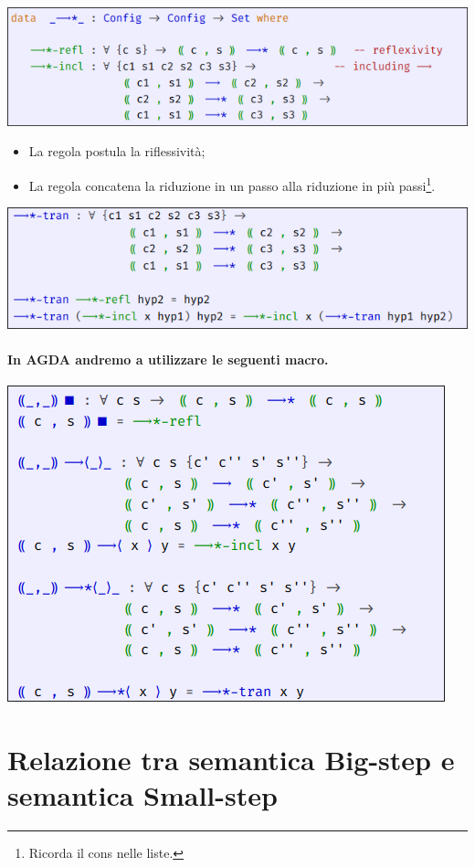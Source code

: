 

\begin{center}
  \includegraphics[scale = 0.55]{images/IMP/C1.png}
\end{center}

\begin{itemize}
  \item La regola  postula la riflessività;
  \item La regola  concatena la riduzione in un passo alla riduzione in più passi\footnote{Ricorda il cons nelle liste.}.
\end{itemize}


\begin{center}
  \includegraphics[scale = 0.55]{images/IMP/C2.png}
\end{center}

\paragraph{In AGDA andremo a utilizzare le seguenti macro.}

\begin{center}
  \includegraphics[scale = 0.75]{images/IMP/Macro.png}
\end{center}

\pagebreak

\section{Relazione tra semantica Big-step e semantica Small-step}



